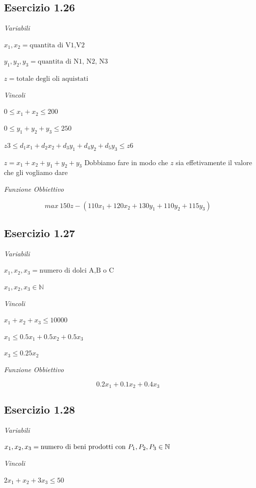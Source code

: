 \subsection{Esercizio 1.26}

\textit{Variabili}

$ x_1,x_2 = \text{quantita di V1,V2} $

$ y_1,y_2,y_3 = \text{quantita di N1, N2, N3} $

$ z = \text{totale degli oli aquistati} $

\textit{Vincoli}

$ 0 \leq x_1 + x_2 \leq 200 $

$ 0 \leq y_1 + y_2 + y_3 \leq 250 $

$ z 3 \leq d_1x_1 + d_2x_2 + d_3y_1 + d_4y_2 + d_5y_3 \leq z 6  $

$ z = x_1 + x_2 + y_1 + y_2 + y_3 $ Dobbiamo fare in modo che $ z $ sia effetivamente il valore che gli vogliamo dare

\textit{Funzione Obbiettivo}

\[
 max\ 150 z - (110 x_1 + 120 x_2 + 130 y_1 + 110 y_2 + 115 y_3)
\]

\subsection{Esercizio 1.27}

\textit{Variabili}

$ x_1, x_2, x_3 = \text{numero di dolci A,B o C} $

$ x_1,x_2, x_3 \in \mathbb{N} $

\textit{Vincoli}

$ x_1 + x_2 + x_3 \leq 10000 $

$ x_1 \leq 0.5 x_1 + 0.5 x_2 + 0.5 x_3 $

$ x_3 \leq 0.25 x_2 $

\textit{Funzione Obbiettivo}

\[
0.2 x_1 + 0.1 x_2 + 0.4 x_3
\]

\subsection{Esercizio 1.28}

\textit{Variabili}

$ x_1,x_2,x_3 = \text{numero di beni prodotti con $ P_1, P_2, P_3 $} \in \mathbb{N} $

\textit{Vincoli}

$ 2x_1 + x_2 + 3x_3 \leq 50 $

